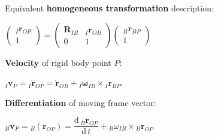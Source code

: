 \documentclass[8pt,landscape]{article}
\newcommand{\vmspace}{\vspace{-7pt}}
\newcommand{\vpspace}{\vspace{9pt}}
\begin{document}
\begin{multicols}{3}
\vpspace

\begin{minipage}{\columnwidth}
  Equivalent \textbf{homogeneous transformation} description:
  \vmspace
  \begin{center}
    $\left(\begin{matrix}
      {}_I\mathbf{r}_{OP} \\
      1
    \end{matrix}\right)
    =
    \left(\begin{matrix}
      \mathbf{R}_{IB} & {}_I\mathbf{r}_{OB} \\
      0 & 1
    \end{matrix}\right)
    \left(\begin{matrix}
      {}_B\mathbf{r}_{BP} \\
      1
    \end{matrix}\right)$
  \end{center}
\end{minipage}

\vpspace

\begin{minipage}{\columnwidth}
  \textbf{Velocity} of rigid body point $P$:
  \vmspace
  \begin{center}
    ${}_I \mathbf v_P = {}_I \mathbf{\dot r}_{OP} = \mathbf{\dot r}_{OB} +
    {}_I\mathbf{\omega}_{IB} \times {}_I\mathbf r_{BP}.$
  \end{center}
\end{minipage}

\vpspace

\begin{minipage}{\columnwidth}
  \textbf{Differentiation} of moving frame vector:
  \vmspace
  \begin{center}
    ${}_B\mathbf v_P = {}_B\left(\mathbf{\dot r}_{OP}\right) = \dfrac{\mathrm
    d\, {}_B\mathbf r_{OP}}{\mathrm d \,t} + {}_B\omega_{IB} \times {}_B\mathbf
    r_{OP}$
  \end{center}
\end{minipage}

\vpspace


\end{multicols}
\end{document}
